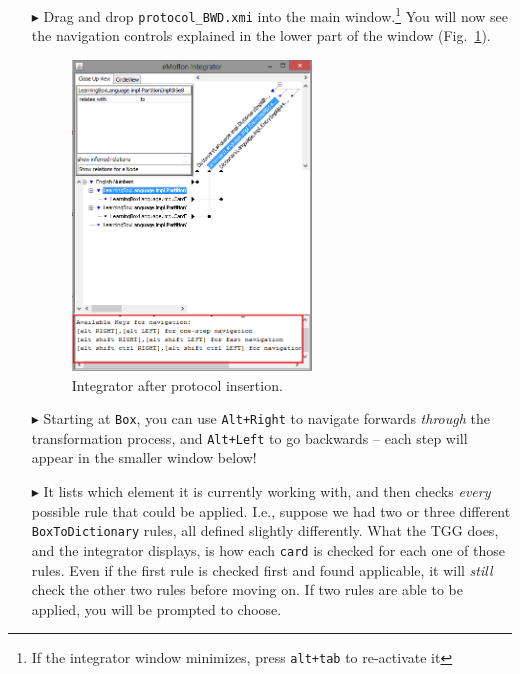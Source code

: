 \begin{itemize}
\item[$\blacktriangleright$] Drag and drop \texttt{protocol\_BWD.xmi} into the main window.\footnote{If the integrator window minimizes, press \texttt{alt+tab}
to re-activate it} You will now see the navigation controls explained in the lower part of the window (Fig.~\ref{fig:integrator_after_protocol}).

\begin{figure}[h!]
\begin{center}
  \includegraphics[width=0.6\textwidth]{integrator_after_protocol_insertion.png}
  \caption{Integrator after protocol insertion.}
  \label{fig:integrator_after_protocol}
\end{center}
\end{figure} 

\item[$\blacktriangleright$]  Starting at \texttt{Box}, you can use \texttt{Alt+Right} to navigate forwards \emph{through} the transformation process, and
\texttt{Alt+Left} to go backwards -- each step will appear in the smaller window below!

\item[$\blacktriangleright$] It lists which element it is currently working with, and then checks \emph{every} possible rule that could be applied. I.e.,
suppose we had two or three different \texttt{BoxToDictionary} rules, all defined slightly differently. What the TGG does, and the integrator displays, is how
each \texttt{card} is checked for each one of those rules. Even if the first rule is checked first and found applicable, it will \emph{still} check the other
two rules before moving on. If two rules are able to be applied, you will be prompted to choose.


\end{itemize}
